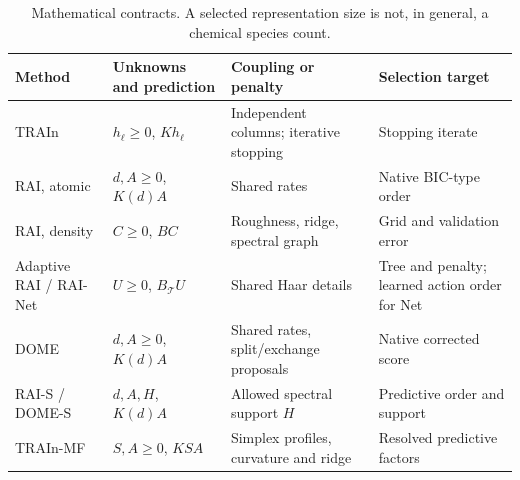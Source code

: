 \begin{table}[htbp]
\caption{Mathematical contracts. A selected representation size is not, in general, a chemical species count.}\label{tab:methodcontract}
\centering\small
\begin{tabularx}{\textwidth}{>{\raggedright\arraybackslash}p{}*{3}{>{\raggedright\arraybackslash}X}}
\toprule
Method & Unknowns and prediction & Coupling or penalty & Selection target\\
\midrule
TRAIn & $h_\ell\geq0$, $Kh_\ell$ & Independent columns; iterative stopping & Stopping iterate\\
RAI, atomic & $d,A\geq0$, $K(d)A$ & Shared rates & Native BIC-type order\\
RAI, density & $C\geq0$, $BC$ & Roughness, ridge, spectral graph & Grid and validation error\\
Adaptive RAI / RAI-Net & $U\geq0$, $B_{\mathcal T}U$ & Shared Haar details & Tree and penalty; learned action order for Net\\
DOME & $d,A\geq0$, $K(d)A$ & Shared rates, split/exchange proposals & Native corrected score\\
RAI-S / DOME-S & $d,A,H$, $K(d)A$ & Allowed spectral support $H$ & Predictive order and support\\
TRAIn-MF & $S,A\geq0$, $KSA$ & Simplex profiles, curvature and ridge & Resolved predictive factors\\
\bottomrule
\end{tabularx}
\end{table}

